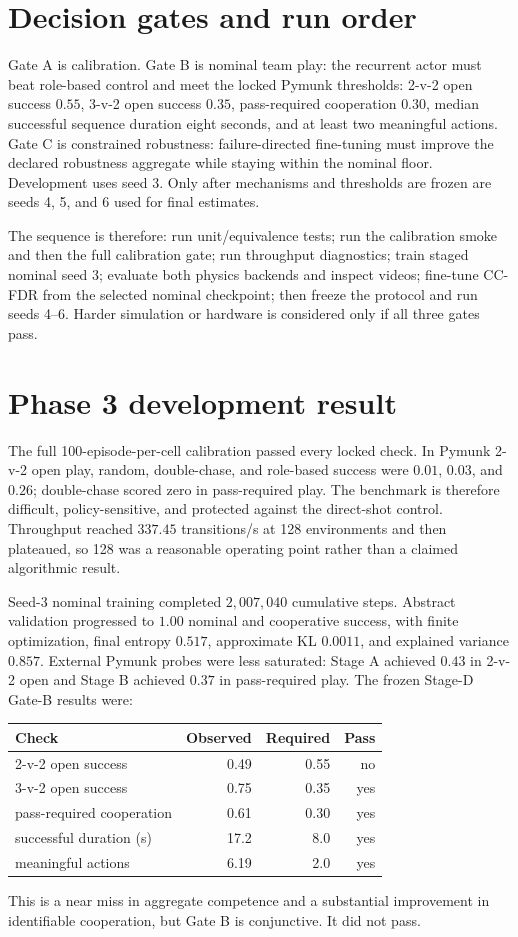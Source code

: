 \documentclass[12pt,twocolumn]{article}
\begin{document}
\section{Decision gates and run order}
Gate A is calibration. Gate B is nominal team play: the recurrent actor must beat role-based
control and meet the locked Pymunk thresholds: 2-v-2 open success $0.55$, 3-v-2 open success
$0.35$, pass-required cooperation $0.30$, median successful sequence duration eight seconds, and
at least two meaningful actions. Gate C is constrained robustness:
failure-directed fine-tuning must improve the declared robustness aggregate while staying within
the nominal floor. Development uses seed 3. Only after mechanisms and thresholds are frozen are
seeds 4, 5, and 6 used for final estimates.

The sequence is therefore: run unit/equivalence tests; run the calibration smoke and then the full
calibration gate; run throughput diagnostics; train staged nominal seed 3; evaluate both physics
backends and inspect videos; fine-tune CC-FDR from the selected nominal checkpoint; then freeze the
protocol and run seeds 4--6. Harder simulation or hardware is considered only if all three gates
pass.

\section{Phase 3 development result}
The full 100-episode-per-cell calibration passed every locked check. In Pymunk 2-v-2 open play,
random, double-chase, and role-based success were $0.01$, $0.03$, and $0.26$; double-chase scored
zero in pass-required play. The benchmark is therefore difficult, policy-sensitive, and protected
against the direct-shot control. Throughput reached $337.45$ transitions/s at 128 environments and
then plateaued, so 128 was a reasonable operating point rather than a claimed algorithmic result.

Seed-3 nominal training completed $2{,}007{,}040$ cumulative steps. Abstract validation progressed
to $1.00$ nominal and cooperative success, with finite optimization, final entropy $0.517$,
approximate KL $0.0011$, and explained variance $0.857$. External Pymunk probes were less
saturated: Stage A achieved $0.43$ in 2-v-2 open and Stage B achieved $0.37$ in pass-required
play. The frozen Stage-D Gate-B results were:
\begin{center}
\scriptsize
\begin{tabular}{lrrr}
\toprule Check & Observed & Required & Pass \\
\midrule
2-v-2 open success & 0.49 & 0.55 & no \\
3-v-2 open success & 0.75 & 0.35 & yes \\
pass-required cooperation & 0.61 & 0.30 & yes \\
successful duration (s) & 17.2 & 8.0 & yes \\
meaningful actions & 6.19 & 2.0 & yes \\
\bottomrule
\end{tabular}
\normalsize
\end{center}
This is a near miss in aggregate competence and a substantial improvement in identifiable
cooperation, but Gate B is conjunctive. It did not pass.
\end{document}
